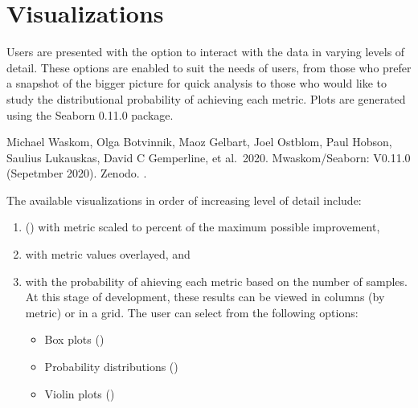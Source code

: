 \documentclass[letterpaper,10pt,english]{sphinxmanual}
\begin{document}
\section{Visualizations}
\label{\detokenize{doc-src/user-interface:visualizations}}
Users are presented with the option to interact with the data in varying
levels of detail. These options are enabled to suit the needs of users,
from those who prefer a snapshot of the bigger picture for quick
analysis to those who would like to study the distributional probability
of achieving each metric. Plots are generated using the Seaborn 0.11.0
package. %
\begin{footnote}[1]\sphinxAtStartFootnote
Michael Waskom, Olga Botvinnik, Maoz Gelbart, Joel Ostblom, Paul
Hobson, Saulius Lukauskas, David C Gemperline, et al. 2020.
Mwaskom/Seaborn: V0.11.0 (Sepetmber 2020). Zenodo.
.
%
\end{footnote} The available visualizations in order of increasing level
of detail include:
\begin{enumerate}
\def\theenumi{\arabic{enumi}}
\def\labelenumi{\theenumi .}
\makeatletter\def\p@enumii{\p@enumi \theenumi .}\makeatother
\item {} 
 () with metric scaled to percent of the
maximum possible improvement,

\item {} 
 with metric values overlayed, and

\item {} 
 with the probability of ahieving each metric based
on the number of samples. At this stage of development, these results
can be viewed in columns (by metric) or in a grid. The user can
select from the following options:
\begin{itemize}
\item {} 
Box plots ()

\item {} 
Probability distributions ()

\item {} 
Violin plots ()

\end{itemize}

\end{enumerate}
\end{document}
